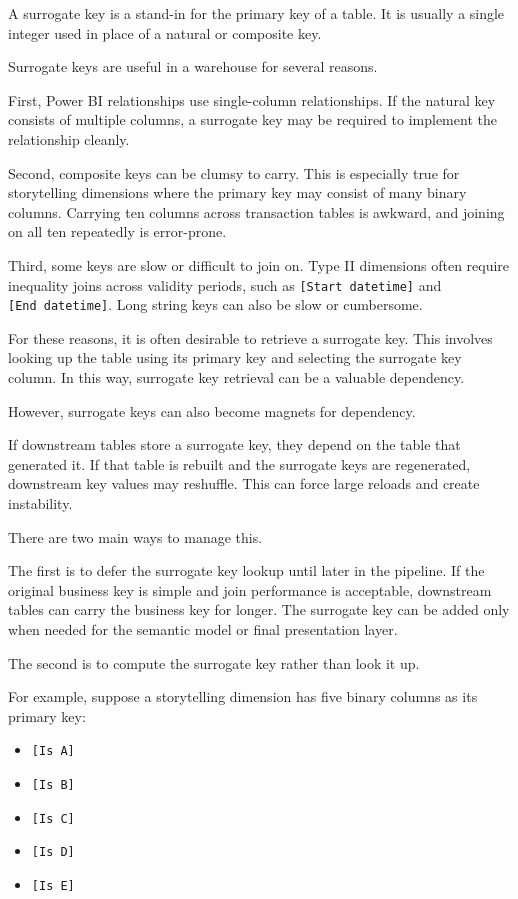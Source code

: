 \documentclass[10pt,openany,10pt]{book}
\providecommand{\tightlist}{%
  \setlength{\itemsep}{0pt}\setlength{\parskip}{0pt}}
\begin{document}
A surrogate key is a stand-in for the primary key of a table. It is
usually a single integer used in place of a natural or composite key.

Surrogate keys are useful in a warehouse for several reasons.

First, Power BI relationships use single-column relationships. If the
natural key consists of multiple columns, a surrogate key may be
required to implement the relationship cleanly.

Second, composite keys can be clumsy to carry. This is especially true
for storytelling dimensions where the primary key may consist of many
binary columns. Carrying ten columns across transaction tables is
awkward, and joining on all ten repeatedly is error-prone.

Third, some keys are slow or difficult to join on. Type II dimensions
often require inequality joins across validity periods, such as
\texttt{{[}Start\ datetime{]}} and \texttt{{[}End\ datetime{]}}. Long
string keys can also be slow or cumbersome.

For these reasons, it is often desirable to retrieve a surrogate key.
This involves looking up the table using its primary key and selecting
the surrogate key column. In this way, surrogate key retrieval can be a
valuable dependency.

However, surrogate keys can also become magnets for dependency.

If downstream tables store a surrogate key, they depend on the table
that generated it. If that table is rebuilt and the surrogate keys are
regenerated, downstream key values may reshuffle. This can force large
reloads and create instability.

There are two main ways to manage this.

The first is to defer the surrogate key lookup until later in the
pipeline. If the original business key is simple and join performance is
acceptable, downstream tables can carry the business key for longer. The
surrogate key can be added only when needed for the semantic model or
final presentation layer.

The second is to compute the surrogate key rather than look it up.

For example, suppose a storytelling dimension has five binary columns as
its primary key:

\begin{itemize}
\tightlist
\item
  \texttt{{[}Is\ A{]}}
\item
  \texttt{{[}Is\ B{]}}
\item
  \texttt{{[}Is\ C{]}}
\item
  \texttt{{[}Is\ D{]}}
\item
  \texttt{{[}Is\ E{]}}
\end{itemize}
\end{document}
